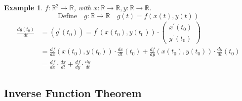 \documentclass[11pt]{article}
\def\RR{\mathbb{R}}
\newtheorem{example}{Example}[section]
\begin{document}
\begin{example}
$f:\RR^2 \rightarrow \RR$, with $x:\RR \rightarrow \RR, y:\RR \rightarrow \RR$. 
\[\text{Define} \quad g:\RR \rightarrow \RR \quad g(t) = f(x(t),y(t))\]
\begin{align*}
\frac{dg(t_0)}{dt} &= (g^{'}(t_0)) = f^{'}(x(t_0), y(t_0)) \cdot \left(
    \begin{array}{c}
      x^{'}(t_0) \\
     y^{'}(t_0)
    \end{array}
  \right)\\
&= \frac{df}{dx}(x(t_0),y(t_0)) \cdot  \frac{dx}{dt}(t_0) + \frac{df}{dy}(x(t_0),y(t_0)) \cdot  \frac{dy}{dt}(t_0) \\
&= \frac{df}{dx}\cdot \frac{dx}{dt} + \frac{df}{dy}\cdot \frac{dy}{dt}
\end{align*}
\end{example}


\subsection{Inverse Function Theorem}
\end{document}
